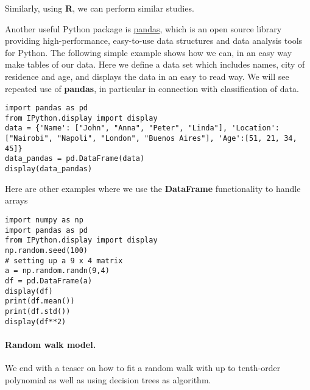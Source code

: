 \documentclass[%
oneside,                 %
final,                   %
10pt]{article}
\begin{document}
Similarly, using \textbf{R}, we can perform similar studies. 



Another useful Python package is
\href{{https://pandas.pydata.org/}}{pandas}, which is an open source library
providing high-performance, easy-to-use data structures and data
analysis tools for Python. The following simple example shows how we can, in an easy way make tables of our data. Here we define a data set which includes names, city of residence and age, and displays the data in an easy to read way. We will see repeated use of \textbf{pandas}, in particular in connection with classification of data. 

\begin{verbatim}
import pandas as pd
from IPython.display import display
data = {'Name': ["John", "Anna", "Peter", "Linda"], 'Location': ["Nairobi", "Napoli", "London", "Buenos Aires"], 'Age':[51, 21, 34, 45]}
data_pandas = pd.DataFrame(data)
display(data_pandas)
\end{verbatim}

Here are other examples where we use the \textbf{DataFrame} functionality to handle arrays
\begin{verbatim}
import numpy as np                                                                               
import pandas as pd
from IPython.display import display
np.random.seed(100)                                                                          
# setting up a 9 x 4 matrix
a = np.random.randn(9,4)
df = pd.DataFrame(a)   
display(df)
print(df.mean())
print(df.std())
display(df**2)
\end{verbatim}



\paragraph{Random walk model.}
We end with a  teaser on how to fit a random walk with up to tenth-order polynomial as well as using decision trees as algorithm. 
\end{document}
